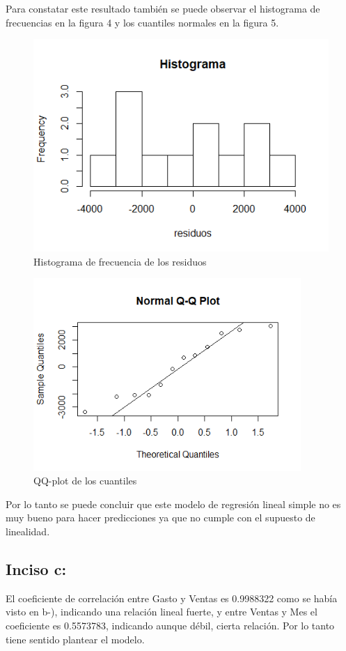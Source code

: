 \documentclass[12pt,a4paper]{article}
\begin{document}
	
	Para constatar este resultado también se puede observar el histograma de frecuencias en la figura 4 y los cuantiles normales en la figura 5.
	
	\begin{figure}[!h]
	\centering
    \includegraphics[scale=0.7]{./images/PLOT3.png}
	\caption{\small{Histograma de frecuencia de los residuos  }}
\end{figure}

	\begin{figure}[!h]
	\centering
	\includegraphics[width=4in]{./images/PLOT4.png}
	\caption{\small{QQ-plot de los cuantiles  }}
\end{figure}

\newpage
	
	Por lo tanto se puede concluir que este modelo de regresión lineal simple no es muy bueno para hacer predicciones ya que no cumple con el supuesto de linealidad.\\

	\subsection{Inciso c: } 
	El coeficiente de correlación entre Gasto y Ventas es 0.9988322 como se había visto en b-), indicando una relación lineal fuerte, y entre Ventas y Mes el coeficiente es 0.5573783, indicando aunque débil, cierta relación. Por lo tanto tiene sentido plantear el modelo.\\
	
\end{document}
